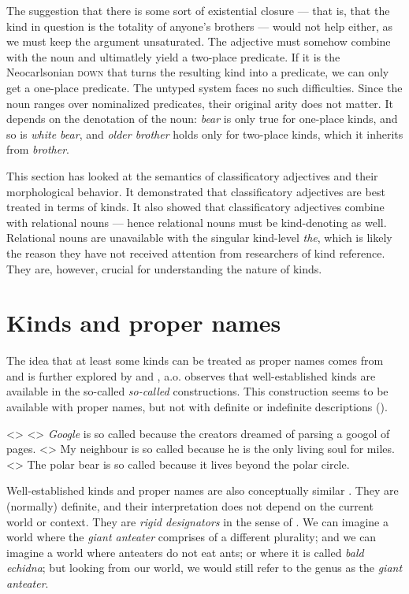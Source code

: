 \documentclass[a4paper, 12pt]{article}
\begin{document}
The suggestion that there is some sort of existential closure --- that is, that the kind in question is the totality of anyone's brothers --- would not help either, as we must keep the argument unsaturated. The adjective must somehow combine with the noun and ultimatlely yield a two-place predicate. If it is the Neocarlsonian \textsc{down} that turns the resulting kind into a predicate, we can only get a one-place predicate. The untyped system faces no such difficulties. Since the noun ranges over nominalized predicates, their original arity does not matter. It depends on the denotation of the noun: \textit{bear} is only true for one-place kinds, and so is \textit{white bear}, and \textit{older brother} holds only for two-place kinds, which it inherits from \textit{brother}.

This section has looked at the semantics of classificatory adjectives and their morphological behavior. It demonstrated that classificatory adjectives are best treated in terms of kinds. It also showed that classificatory adjectives combine with relational nouns --- hence relational nouns must be kind-denoting as well. Relational nouns are unavailable with the singular kind-level \textit{the}, which is likely the reason they have not received attention from researchers of kind reference. They are, however, crucial for understanding the nature of kinds.

\section{Kinds and proper names}\label{pn}

The idea that at least some kinds can be treated as proper names comes from \textcite{carlson1977referencekindsenglish} and is further explored by \textcite{heyer1985genericdescriptionsdefault} and \textcite{krifka1995genericityintroduction}, a.o.  observes that well-established kinds are available in the so-called \textit{so-called} constructions. This construction seems to be available with proper names, but not with definite or indefinite descriptions (\nextx).

\pex<>
    \a<> \textit{Google} is so called because the creators dreamed of parsing a googol of pages.
    \a<> \ljudge* My neighbour is so called because he is the only living soul for miles.
    \a<> The polar bear is so called because it lives beyond the polar circle.
\xe

Well-established kinds and proper names are also conceptually similar \parencite[65]{krifka1995genericityintroduction}. They are (normally) definite, and their interpretation does not depend on the current world or context. They are \emph{rigid designators} in the sense of \parencite{kripke1980namingnecessity}. We can imagine a world where the \textit{giant anteater} comprises of a different plurality; and we can imagine a world where anteaters do not eat ants; or where it is called \textit{bald echidna}; but looking from our world, we would still refer to the genus as the \textit{giant anteater}.
\end{document}
